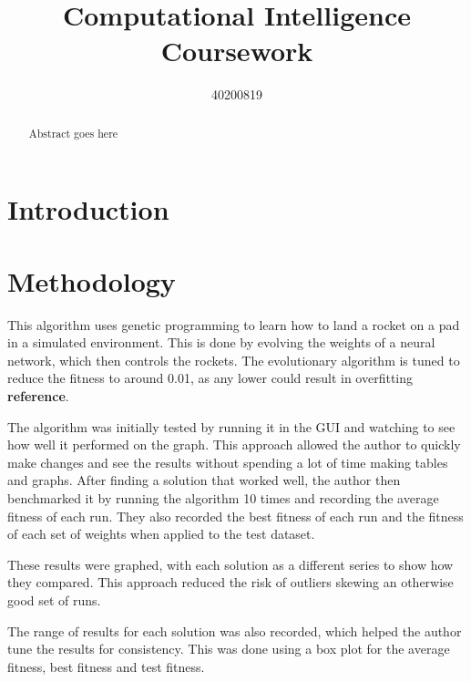 \documentclass[sigconf]{acmart}
\begin{document}
\title{Computational Intelligence Coursework}

\author{40200819}



\begin{abstract}
Abstract goes here
\end{abstract}





\maketitle

\section{Introduction}

\section{Methodology}
This algorithm uses genetic programming to learn how to land a rocket on a pad in a simulated environment. This is done by evolving the weights of a neural network, which then controls the rockets. The evolutionary algorithm is tuned to reduce the fitness to around 0.01, as any lower could result in overfitting \textbf{reference}.

The algorithm was initially tested by running it in the GUI and watching to see how well it performed on the graph. This approach allowed the author to quickly make changes and see the results without spending a lot of time making tables and graphs. After finding a solution that worked well, the author then benchmarked it by running the algorithm 10 times and recording the average fitness of each run. They also recorded the best fitness of each run and the fitness of each set of weights when applied to the test dataset.

These results were graphed, with each solution as a different series to show how they compared. This approach reduced the risk of outliers skewing an otherwise good set of runs.

The range of results for each solution was also recorded, which helped the author tune the results for consistency. This was done using a box plot for the average fitness, best fitness and test fitness.
\end{document}
